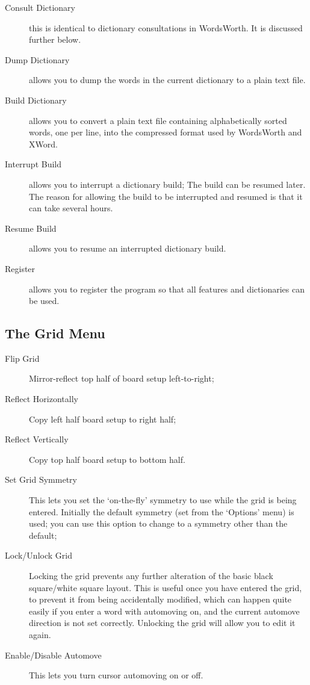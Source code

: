 \begin{description}
\item [Consult Dictionary] this is identical to dictionary
consultations in WordsWorth. It is discussed further below.
\item [Dump Dictionary] allows you to dump the words in the current
dictionary to a plain text file.
\item [Build Dictionary] allows you to convert a plain text file
containing alphabetically sorted words, one per line, into the
compressed format used by WordsWorth and XWord.
\item [Interrupt Build] allows you to interrupt a dictionary build;
The build can be resumed later. The reason for allowing the build
to be interrupted and resumed is that it can take several hours.
\item [Resume Build] allows you to resume an interrupted dictionary build.
\item [Register] allows you to register the program so that all
features and dictionaries can be used.
\end{description}

\subsection{The Grid Menu}

\begin{description}
\item [Flip Grid] Mirror-reflect top half of board setup
left-to-right;
\item [Reflect Horizontally] Copy left half board setup to right
half;
\item [Reflect Vertically] Copy top half board setup to bottom half.
\item [Set Grid Symmetry] This lets you set the `on-the-fly'
symmetry to use while the grid is being entered. Initially
the default symmetry (set from the `Options' menu) is used;
you can use this option to change to a symmetry other than
the default;
\item [Lock/Unlock Grid] Locking the grid prevents any further
alteration of the basic black square/white square layout. 
This is useful once you have entered the grid, to prevent it
from being accidentally modified, which can happen quite 
easily if you enter a word with automoving on, and the 
current automove direction is not set correctly. Unlocking
the grid will allow you to edit it again.
\item [Enable/Disable Automove] This lets you turn cursor
automoving on or off.
\end{description}

